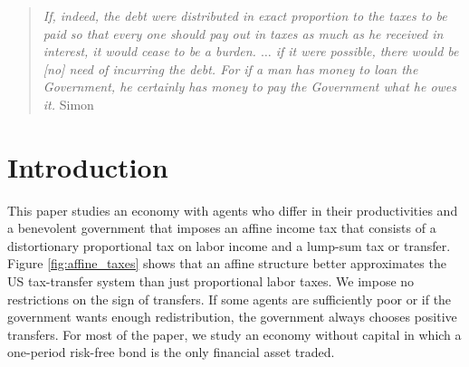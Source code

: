 \documentclass[thmsb,11pt]{article}
\begin{document}
\bigskip \newpage

\setcounter{page}{1}

\bigskip \baselineskip0.65cm


%




\begin{quote}
\emph{If, indeed, the debt were distributed in exact proportion to the taxes
to be paid so that every one should pay out in taxes as much as he received
in interest, it would cease to be a burden.%
$\ldots$ if it were possible, there
would be [no] need of incurring the debt. For if a man has money to loan the
Government, he certainly has money to pay the Government what he owes it.
}Simon \citet[p.85]{newcomb1865critical}
\end{quote}




\section{Introduction}
%

This paper studies  an economy with  agents who differ in
their productivities and a  benevolent government that imposes an affine income tax that consists of a distortionary proportional
tax on labor income and a lump-sum tax or transfer. Figure \ref{fig:affine_taxes} shows that an affine structure better approximates the US tax-transfer system than just proportional labor taxes.  We
impose no restrictions on the sign of transfers. If some agents are
sufficiently poor or if the government wants enough redistribution, the
government  always chooses positive transfers.
For most of the paper, we  study an economy without capital in
which  a one-period risk-free bond is the only financial asset traded.
\end{document}
